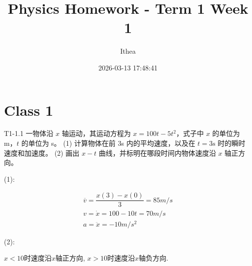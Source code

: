 \documentclass[UTF8]{ctexart} %
\title{Physics Homework - Term 1 Week 1}
\author{Ithea}
\date{2026-03-13 17:48:41}
\begin{document}
\maketitle

\section{Class 1}

\begin{question}{T1-1.1}
一物体沿 \(x\) 轴运动，其运动方程为 \(x = 100t - 5t^2\)，式子中 \(x\) 的单位为 m，\(t\) 的单位为 s。
(1) 计算物体在前 3s 内的平均速度，以及在 \(t=3\text{s}\) 时的瞬时速度和加速度。
(2) 画出 \(x-t\) 曲线，并标明在哪段时间内物体速度沿 \(x\) 轴正方向。
\end{question}
\begin{solve}

(1):

\[
\begin{gathered}
\overline v=\dfrac{x(3)-x(0)}{3}=85 m/s \\
v=\dot x=100-10t=70 m/s \\
a=\ddot x=-10 m/s^2
\end{gathered}
\]


(2):


\(x<10\)时速度沿\(x\)轴正方向, \(x>10\)时速度沿\(x\)轴负方向.

\end{solve}
\end{document}
